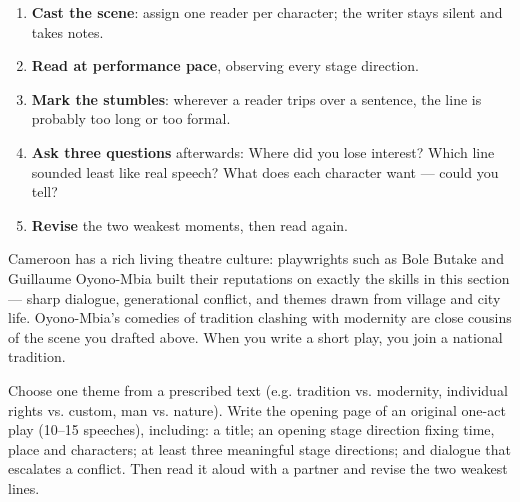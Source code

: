 \documentclass[11pt]{article}
\begin{document}
\begin{methode}
\begin{enumerate}
\item \textbf{Cast the scene}: assign one reader per character; the writer stays silent and takes notes.
\item \textbf{Read at performance pace}, observing every stage direction.
\item \textbf{Mark the stumbles}: wherever a reader trips over a sentence, the line is probably too long or too formal.
\item \textbf{Ask three questions} afterwards: Where did you lose interest? Which line sounded least like real speech? What does each character want — could you tell?
\item \textbf{Revise} the two weakest moments, then read again.
\end{enumerate}
\end{methode}

\begin{savaistu}
Cameroon has a rich living theatre culture: playwrights such as Bole Butake and Guillaume Oyono-Mbia built their reputations on exactly the skills in this section — sharp dialogue, generational conflict, and themes drawn from village and city life. Oyono-Mbia's comedies of tradition clashing with modernity are close cousins of the scene you drafted above. When you write a short play, you join a national tradition.
\end{savaistu}

\begin{exercice}
Choose one theme from a prescribed text (e.g. tradition vs. modernity, individual rights vs. custom, man vs. nature). Write the opening page of an original one-act play (10--15 speeches), including: a title; an opening stage direction fixing time, place and characters; at least three meaningful stage directions; and dialogue that escalates a conflict. Then read it aloud with a partner and revise the two weakest lines.
\end{exercice}
\end{document}
